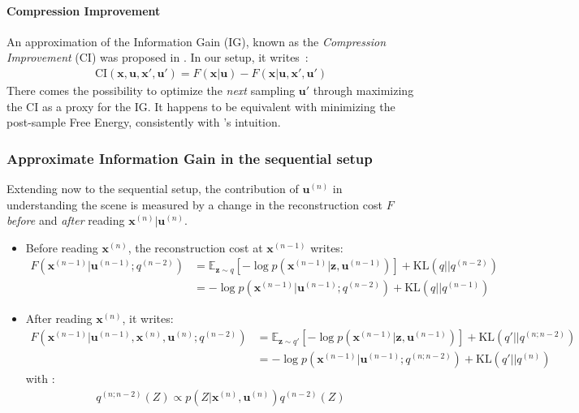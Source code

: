 \documentclass[12pt,twoside,openright]{article}
\begin{document}
\paragraph{Compression Improvement}
An approximation of the Information Gain (IG), known as the \emph{Compression Improvement} (CI) was proposed in \citet{schmidhuber2007simple,houthooft2016vime}. In our setup, it
writes~:
\begin{align}
	\text{CI}(\boldsymbol{x},\boldsymbol{u}, \boldsymbol{x}', \boldsymbol{u}') = F(\boldsymbol{x}|\boldsymbol{u}) - F(\boldsymbol{x}|\boldsymbol{u}, \boldsymbol{x}', \boldsymbol{u}') \label{eq:CI-base}
\end{align}	
There comes the possibility to  {\color{Purple}optimize the \emph{next} sampling $\boldsymbol{u}'$ through maximizing the CI as a proxy for the IG. It happens 
	to be equivalent with minimizing the post-sample Free Energy, consistently with \citet{friston2012perceptions}'s intuition.}

\subsubsection{Approximate Information Gain in the sequential setup}

{\color{Purple} Extending now to the sequential setup}, the contribution of $\boldsymbol{u}^{(n)}$ in understanding the scene is measured by a change in the reconstruction cost $F$ \emph{before} and \emph{after} reading $\boldsymbol{x}^{(n)}|\boldsymbol{u}^{(n)}$.
\begin{itemize}
	\item Before {\color{Purple} reading $\boldsymbol{x}^{(n)}$}, the reconstruction cost at $\boldsymbol{x}^{(n-1)}$ writes:
	\begin{align}
		F(\boldsymbol{x}^{(n-1)}|\boldsymbol{u}^{(n-1)}; q^{(n-2)}) 
		&= \mathbb{E}_{\boldsymbol{z} \sim q} \left[-\log p(\boldsymbol{x}^{(n-1)}| \boldsymbol{z}, \boldsymbol{u}^{(n-1)} )
		\right] + \text{KL}(q||q^{(n-2)}) \label{eq:F_pre_var}\\
		&= -\log p(\boldsymbol{x}^{(n-1)}|\boldsymbol{u}^{(n-1)}; q^{(n-2)}) + \text{KL} (q||q^{(n-1)})\label{eq:F_pre_KL}
	\end{align}
	\item After {\color{Purple} reading $\boldsymbol{x}^{(n)}$}, it writes:
	\begin{align}
		F(\boldsymbol{x}^{(n-1)}|\boldsymbol{u}^{(n-1)},\boldsymbol{x}^{(n)},\boldsymbol{u}^{(n)}; q^{(n-2)}) 
		&= \mathbb{E}_{\boldsymbol{z} \sim q'} \left[-\log p(\boldsymbol{x}^{(n-1)}| \boldsymbol{z}, \boldsymbol{u}^{(n-1)} )
		\right] + \text{KL}(q'||q^{(n;n-2)}) \label{eq:F_post_var}\\
		&= -\log p(\boldsymbol{x}^{(n-1)}|\boldsymbol{u}^{(n-1)}; q^{(n;n-2)}) + \text{KL} (q'||q^{(n)})\label{eq:F_post_KL}
	\end{align}
	with :
	\begin{align}
		q^{(n; n-2)}(Z) \propto p(Z|\boldsymbol{x}^{(n)}, \boldsymbol{u}^{(n)})q^{(n-2)}(Z)\label{eq:n-n-2}
	\end{align}
\end{itemize}
\end{document}
